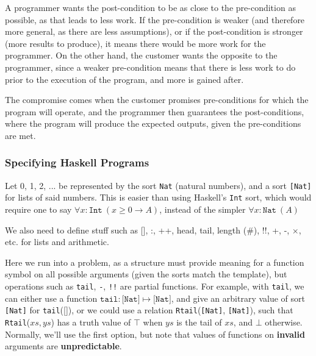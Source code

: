 \documentclass[a4paper, 12pt]{article}
\begin{document}
            A programmer wants the post-condition to be as close to the pre-condition as possible, as that leads to less work. If the pre-condition is weaker (and therefore more general, as there are less assumptions), or if the post-condition is stronger (more results to produce), it means there would be more work for the programmer. On the other hand, the customer wants the opposite to the programmer, since a weaker pre-condition means that there is less work to do prior to the execution of the program, and more is gained after.
            \medskip

            The compromise comes when the customer promises pre-conditions for which the program will operate, and the programmer then guarantees the post-conditions, where the program will produce the expected outputs, given the pre-conditions are met.
            \subsubsection*{Specifying Haskell Programs}
                Let 0, 1, 2, ... be represented by the sort \texttt{Nat} (natural numbers), and a sort \texttt{[Nat]} for lists of said numbers. This is easier than using Haskell's \texttt{Int} sort, which would require one to say $\forall x : \texttt{Int}\ (x \geq 0 \rightarrow A)$, instead of the simpler $\forall x : \texttt{Nat}\ (A)$
                \medskip

                We also need to define stuff such as [], :, ++, head, tail, length (\#), !!, +, -, $\times$, etc. for lists and arithmetic.
                \smallskip

                Here we run into a problem, as a structure must provide meaning for a function symbol on all possible arguments (given the sorts match the template), but operations such as \texttt{tail}, \texttt{-}, \texttt{!!} are partial functions. For example, with \texttt{tail}, we can either use a function $\texttt{tail}: \texttt{[Nat]} \mapsto \texttt{[Nat]}$, and give an arbitrary value of sort \texttt{[Nat]} for \texttt{tail}([]), or we could use a relation \texttt{Rtail}(\texttt{[Nat]}, \texttt{[Nat]}), such that \texttt{Rtail}($xs, ys$) has a truth value of $\top$ when $ys$ is the tail of $xs$, and $\bot$ otherwise. Normally, we'll use the first option, but note that values of functions on \textbf{invalid} arguments are \textbf{unpredictable}.
                \medskip
\end{document}
